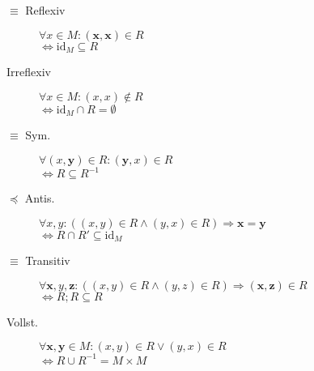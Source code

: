\documentclass[uniLeipzig]{merkzettel}
\begin{document}
\begin{mzImportant}
  \begin{description}
    \item [$\boldsymbol{\equiv}$ Reflexiv]
          $\forall x \in M: (\mathbf{x}, \mathbf{x}) \in R$ \\
          $\Leftrightarrow \text{id}_M \subseteq R$

    \item [Irreflexiv]
          $\forall x \in M: (x, x) \boldsymbol{\notin} R$ \\
          $\Leftrightarrow \text{id}_M \cap R = \emptyset$

    \item [$\boldsymbol{\equiv}$ Sym.]
          $\forall (x,\mathbf{y}) \in R: (\mathbf{y}, x) \in R$ \\
          $\Leftrightarrow R \subseteq R^{-1}$

    \item [$\boldsymbol{\preceq}$ Antis.]
          $\forall x,y: ((x,y) \in R \land (y,x) \in R) \Rightarrow \mathbf{x = y}$ \\
          $\Leftrightarrow R \cap R' \subseteq \text{id}_M$

    \item [$\boldsymbol{\equiv}$ Transitiv]
          $\forall \mathbf{x},y,\mathbf{z}: ((x,y) \in R \land (y,z) \in R) \Rightarrow (\mathbf{x},\mathbf{z}) \in R$ \\
          $\Leftrightarrow R;R \subseteq R$

    \item [Vollst.]
          $\forall \mathbf{x},\mathbf{y} \in M: (x,y) \in R \lor (y,x) \in R$ \\
          $\Leftrightarrow R \cup R^{-1} = M \times M$
  \end{description}
\end{mzImportant}
\end{document}

